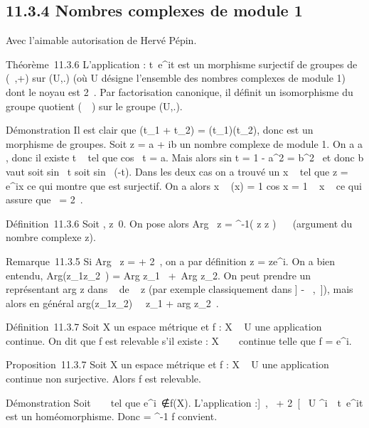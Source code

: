 \documentclass[]{article}
\begin{document}
\subsection{11.3.4 Nombres complexes de module 1}

Avec l'aimable autorisation de Hervé Pépin.

Théorème~11.3.6 L'application \phi :
t\mapsto~e^it est un morphisme surjectif
de groupes de (~,+) sur (U,.) (où U désigne l'ensemble des nombres
complexes de module 1) dont le noyau est 2\pi~. Par factorisation
canonique, il définit un isomorphisme \overline\phi du
groupe quotient (~\pi~) sur le groupe (U,.).

Démonstration Il est clair que \phi(t_1 + t_2) =
\phi(t_1)\phi(t_2), donc \phi est un morphisme de groupes. Soit
z = a + ib un nombre complexe de module 1. On a a \in [-1,1], donc il
existe t \in {}~ tel que cos~ t = a. Mais alors
sin t = 1 - a^2 = b^2~ et
donc b vaut soit sin~ t soit
sin~ (-t). Dans les deux cas on a trouvé un x \in
{}~ tel que z = e^ix ce qui montre que \phi est surjectif. On a
alors x \in\mathrmKer~\phi
\Leftrightarrow \phi(x) = 1 \mathrel\Leftrightarrow
cos x = 1 \mathrel\Leftrightarrow~ x \pi~
ce qui assure que
\mathrmKer~\phi = 2\pi~.

Définition~11.3.6 Soit \zeta \in {}, z\neq~0. On pose
alors Arg~ z =
\overline\phi^-1( z \over
z ) \in {}~\pi~ (argument du nombre complexe z).

Remarque~11.3.5 Si Arg~ z = \theta + 2\pi~, on a par
définition z = ze^i\theta. On a bien entendu,
Arg(z_1z_2~)
= Arg z_1~ + z_2. On peut prendre un représentant
arg z dans ~ de \Arg~
z (par exemple classiquement dans ] - \pi~,\pi~]), mais alors en général
arg(z_1z_2)\neq~\arg~
z_1 + arg z_2~.

Définition~11.3.7 Soit X un espace métrique et f : X \rightarrow~ U une application
continue. On dit que f est relevable s'il existe \phi : X \rightarrow~ \mathbb{R}~ continue
telle que f = e^i\phi.

Proposition~11.3.7 Soit X un espace métrique et f : X \rightarrow~ U une
application continue non surjective. Alors f est relevable.

Démonstration Soit \alpha~ \in {}~ tel que
e^i\alpha~∉f(X). L'application \omega :]\alpha~,\alpha~
+ 2\pi~[\rightarrow~ U \diagdown\e^i\alpha~\,
t\mapsto~e^it est un homéomorphisme. Donc
\phi = \omega^-1 \cdot f convient.
\end{document}
